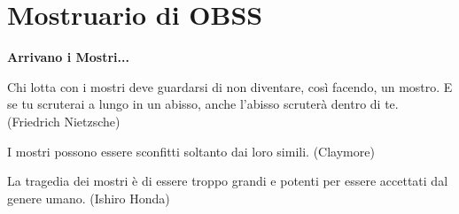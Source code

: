 \section{Mostruario di OBSS}

\textbf{Arrivano i Mostri...}

\begin{changemargin}{0cm}{0.5cm}\begin{enfasi}{Chi lotta con i mostri deve guardarsi di non diventare, così facendo, un mostro. E se tu scruterai a lungo in un abisso, anche l'abisso scruterà dentro di te. (Friedrich Nietzsche)

			\medskip

			I mostri possono essere sconfitti soltanto dai loro simili. (Claymore)

			\medskip

			La tragedia dei mostri è di essere troppo grandi e potenti per essere accettati dal genere umano. (Ishiro Honda)}\end{enfasi}\end{changemargin}\medskip

